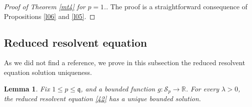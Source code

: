 \documentclass[reqno]{amsart}
\theoremstyle{plain}
\newtheorem{lemma}[theorem]{Lemma}
\theoremstyle{definition}
\newcommand{\mf}[1]{{\mathfrak #1}}
\newcommand{\bb}[1]{{\mathbb #1}}
\newcommand{\ms}[1]{{\mathscr #1}}
\newcounter{as}[section]
\newcommand{\<}{\langle}
\renewcommand{\>}{\rangle}
\begin{document}
\begin{proof}[Proof of Theorem \ref{mt4} for $p=1$.]
The proof is a straightforward consequence of Propositions \ref{l06}
and \ref{l05}.
\end{proof}

\subsection*{Reduced resolvent equation}
\label{sec-ap2}

As we did not find a reference, we prove in this subsection the
reduced resolvent equation solution uniqueness.

\begin{lemma}
\label{l30}
Fix $1\le p\le \mf q$, and a bounded function
$g\colon \ms S_p \to \bb R$. For every $\lambda>0$, the reduced
resolvent equation \eqref{42} has a unique bounded solution.
\end{lemma}
\end{document}
